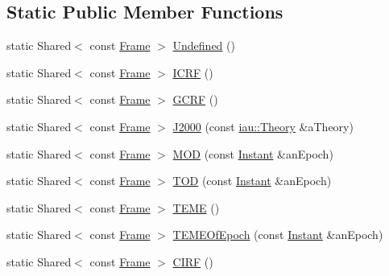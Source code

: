 \subsection*{Static Public Member Functions}
\begin{DoxyCompactItemize}
\item 
static Shared$<$ const \hyperlink{classostk_1_1physics_1_1coord_1_1_frame}{Frame} $>$ \hyperlink{classostk_1_1physics_1_1coord_1_1_frame_a292d32b849648a8e530d35ac47b5c699}{Undefined} ()
\item 
static Shared$<$ const \hyperlink{classostk_1_1physics_1_1coord_1_1_frame}{Frame} $>$ \hyperlink{classostk_1_1physics_1_1coord_1_1_frame_af111d96da6adf5405a354a769618b5f4}{I\+C\+RF} ()
\item 
static Shared$<$ const \hyperlink{classostk_1_1physics_1_1coord_1_1_frame}{Frame} $>$ \hyperlink{classostk_1_1physics_1_1coord_1_1_frame_abe31c60e3e7f654b101876cb6b9b5238}{G\+C\+RF} ()
\item 
static Shared$<$ const \hyperlink{classostk_1_1physics_1_1coord_1_1_frame}{Frame} $>$ \hyperlink{classostk_1_1physics_1_1coord_1_1_frame_af0da70b1c514938c055097cd5b8b7a3a}{J2000} (const \hyperlink{namespaceostk_1_1physics_1_1coord_1_1frame_1_1providers_1_1iau_ae5e299153ae66dd034c8427dabfaff05}{iau\+::\+Theory} \&a\+Theory)
\item 
static Shared$<$ const \hyperlink{classostk_1_1physics_1_1coord_1_1_frame}{Frame} $>$ \hyperlink{classostk_1_1physics_1_1coord_1_1_frame_a3d0822a703af130adbc1f93dfd1faad9}{M\+OD} (const \hyperlink{classostk_1_1physics_1_1time_1_1_instant}{Instant} \&an\+Epoch)
\item 
static Shared$<$ const \hyperlink{classostk_1_1physics_1_1coord_1_1_frame}{Frame} $>$ \hyperlink{classostk_1_1physics_1_1coord_1_1_frame_a433d54de1c22b08f1f8fe2574d468a59}{T\+OD} (const \hyperlink{classostk_1_1physics_1_1time_1_1_instant}{Instant} \&an\+Epoch)
\item 
static Shared$<$ const \hyperlink{classostk_1_1physics_1_1coord_1_1_frame}{Frame} $>$ \hyperlink{classostk_1_1physics_1_1coord_1_1_frame_a1441cef9cd2abe312753f3a81606adfb}{T\+E\+ME} ()
\item 
static Shared$<$ const \hyperlink{classostk_1_1physics_1_1coord_1_1_frame}{Frame} $>$ \hyperlink{classostk_1_1physics_1_1coord_1_1_frame_ab47046bc517b04537c96844d95c13fdd}{T\+E\+M\+E\+Of\+Epoch} (const \hyperlink{classostk_1_1physics_1_1time_1_1_instant}{Instant} \&an\+Epoch)
\item 
static Shared$<$ const \hyperlink{classostk_1_1physics_1_1coord_1_1_frame}{Frame} $>$ \hyperlink{classostk_1_1physics_1_1coord_1_1_frame_ae858400dfa432f12b71712b52b3f5108}{C\+I\+RF} ()

\end{DoxyCompactItemize}
